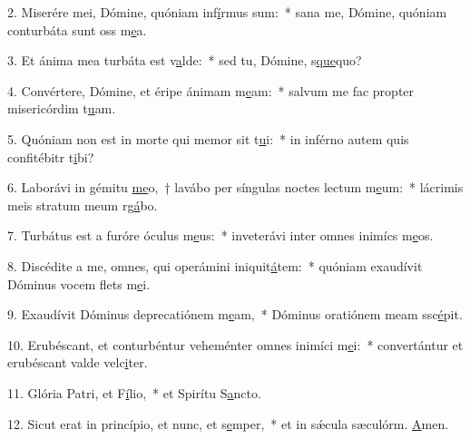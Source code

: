2. Miserére mei, Dómine, quóniam inf\uline{í}rmus sum:~* sana me, Dómine, quóniam conturbáta sunt oss m\uline{e}a.\par 
3. Et ánima mea turbáta est v\uline{a}lde:~* sed tu, Dómine, s\uline{que}quo?\par 
4. Convértere, Dómine, et éripe ánimam m\uline{e}am:~* salvum me fac propter misericórdim t\uline{u}am.\par 
5. Quóniam non est in morte qui memor sit t\uline{u}i:~* in inférno autem quis confitébitr t\uline{i}bi?\par 
6. Laborávi in gémitu \uline{me}o,~† lavábo per síngulas noctes lectum m\uline{e}um:~* lácrimis meis stratum meum rg\uline{á}bo.\par 
7. Turbátus est a furóre óculus m\uline{e}us:~* inveterávi inter omnes inimícs m\uline{e}os.\par 
8. Discédite a me, omnes, qui operámini iniquit\uline{á}tem:~* quóniam exaudívit Dóminus vocem flets m\uline{e}i.\par 
9. Exaudívit Dóminus deprecatiónem m\uline{e}am,~* Dóminus oratiónem meam ssc\uline{é}pit.\par 
10. Erubéscant, et conturbéntur veheménter omnes inimíci m\uline{e}i:~* convertántur et erubéscant valde velc\uline{i}ter.\par 
11. Glória Patri, et F\uline{í}lio,~* et Spirítu S\uline{a}ncto.\par 
12. Sicut erat in princípio, et nunc, et s\uline{e}mper,~* et in sǽcula sæculórm. \uline{A}men.\par 
